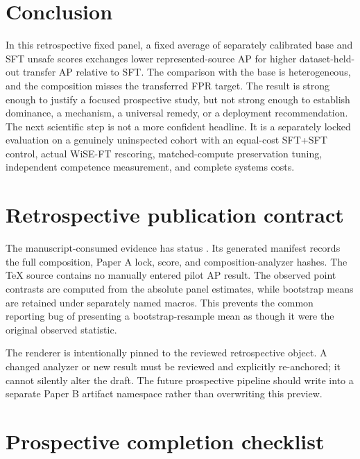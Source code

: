 \documentclass[11pt]{article}
\begin{document}
\section{Conclusion}
\label{sec:conclusion}

In this retrospective fixed panel, a fixed average of separately calibrated base and SFT unsafe
scores exchanges lower represented-source AP for higher dataset-held-out transfer AP relative to
SFT.  The comparison with the base is heterogeneous, and the composition misses the transferred
FPR target.  The result is strong enough to justify a focused prospective study, but not strong
enough to establish dominance, a mechanism, a universal remedy, or a deployment recommendation.
The next scientific step is not a more confident headline.  It is a separately locked evaluation
on a genuinely uninspected cohort with an equal-cost SFT+SFT control, actual WiSE-FT rescoring,
matched-compute preservation tuning, independent competence measurement, and complete systems
costs.




\appendix
\section{Retrospective publication contract}
\label{app:contract}

The manuscript-consumed evidence has status \PilotEvidenceStatus.  Its generated manifest records
the full composition, Paper A lock, score, and composition-analyzer hashes.  The TeX source contains
no manually entered pilot AP result.  The observed point contrasts are computed from the absolute
panel estimates, while bootstrap means are retained under separately named macros.  This prevents
the common reporting bug of presenting a bootstrap-resample mean as though it were the original
observed statistic.

The renderer is intentionally pinned to the reviewed retrospective object.  A changed analyzer or
new result must be reviewed and explicitly re-anchored; it cannot silently alter the draft.  The
future prospective pipeline should write into a separate Paper B artifact namespace rather than
overwriting this preview.

\section{Prospective completion checklist}
\label{app:checklist}
\end{document}
